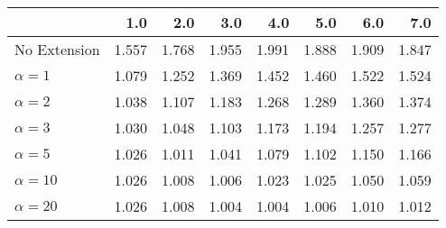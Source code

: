 \begin{tabular}{lrrrrrrr}
\toprule
{} &   1.0 &   2.0 &   3.0 &   4.0 &   5.0 &   6.0 &   7.0 \\
\midrule
No Extension  & 1.557 & 1.768 & 1.955 & 1.991 & 1.888 & 1.909 & 1.847 \\
$\alpha = 1$  & 1.079 & 1.252 & 1.369 & 1.452 & 1.460 & 1.522 & 1.524 \\
$\alpha = 2$  & 1.038 & 1.107 & 1.183 & 1.268 & 1.289 & 1.360 & 1.374 \\
$\alpha = 3$  & 1.030 & 1.048 & 1.103 & 1.173 & 1.194 & 1.257 & 1.277 \\
$\alpha = 5$  & 1.026 & 1.011 & 1.041 & 1.079 & 1.102 & 1.150 & 1.166 \\
$\alpha = 10$ & 1.026 & 1.008 & 1.006 & 1.023 & 1.025 & 1.050 & 1.059 \\
$\alpha = 20$ & 1.026 & 1.008 & 1.004 & 1.004 & 1.006 & 1.010 & 1.012 \\
\bottomrule
\end{tabular}
